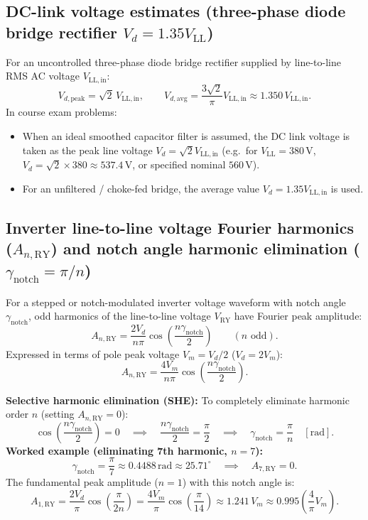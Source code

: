 \subsection{DC-link voltage estimates (three-phase diode bridge rectifier \texorpdfstring{$V_d = 1.35 V_{\mathrm{LL}}$}{V_d = 1.35 V_LL})}
For an uncontrolled three-phase diode bridge rectifier supplied by line-to-line RMS AC voltage \(V_{\mathrm{LL,in}}\):
\[
V_{d,\mathrm{peak}} = \sqrt{2}\,V_{\mathrm{LL,in}},
\qquad
V_{d,\mathrm{avg}} = \frac{3\sqrt{2}}{\pi}V_{\mathrm{LL,in}} \approx 1.350\,V_{\mathrm{LL,in}}.
\]
In course exam problems:
\begin{itemize}
  \item When an ideal smoothed capacitor filter is assumed, the DC link voltage is taken as the peak line voltage \(V_d = \sqrt{2} V_{\mathrm{LL,in}}\) (e.g.\ for \(V_{\mathrm{LL}}=380\,\mathrm{V}\), \(V_d = \sqrt{2}\times 380 \approx 537.4\,\mathrm{V}\), or specified nominal \(560\,\mathrm{V}\)).
  \item For an unfiltered / choke-fed bridge, the average value \(V_d = 1.35 V_{\mathrm{LL,in}}\) is used.
\end{itemize}

\subsection{Inverter line-to-line voltage Fourier harmonics (\texorpdfstring{$A_{n,\mathrm{RY}}$}{A_n,RY}) and notch angle harmonic elimination (\texorpdfstring{$\gamma_{\mathrm{notch}} = \pi/n$}{gamma_notch = pi/n})}
For a stepped or notch-modulated inverter voltage waveform with notch angle \(\gamma_{\mathrm{notch}}\), odd harmonics of the line-to-line voltage \(V_{\mathrm{RY}}\) have Fourier peak amplitude:
\[
A_{n,\mathrm{RY}} = \frac{2 V_d}{n\pi}\cos\left(\frac{n\gamma_{\mathrm{notch}}}{2}\right) \qquad (n\text{ odd}).
\]
Expressed in terms of pole peak voltage \(V_m = V_d/2\) (\(V_d = 2 V_m\)):
\[
A_{n,\mathrm{RY}} = \frac{4 V_m}{n\pi}\cos\left(\frac{n\gamma_{\mathrm{notch}}}{2}\right).
\]

\textbf{Selective harmonic elimination (SHE):}
To completely eliminate harmonic order \(n\) (setting \(A_{n,\mathrm{RY}} = 0\)):
\[
\cos\left(\frac{n\gamma_{\mathrm{notch}}}{2}\right) = 0
\quad\implies\quad
\frac{n\gamma_{\mathrm{notch}}}{2} = \frac{\pi}{2}
\quad\implies\quad
\gamma_{\mathrm{notch}} = \frac{\pi}{n} \quad [\mathrm{rad}].
\]
\textbf{Worked example (eliminating 7th harmonic, \(n=7\)):}
\[
\gamma_{\mathrm{notch}} = \frac{\pi}{7} \approx 0.4488\,\mathrm{rad} \approx 25.71^\circ
\quad\implies\quad
A_{7,\mathrm{RY}} = 0.
\]
The fundamental peak amplitude (\(n=1\)) with this notch angle is:
\[
A_{1,\mathrm{RY}} = \frac{2 V_d}{\pi}\cos\left(\frac{\pi}{2n}\right) = \frac{4 V_m}{\pi}\cos\left(\frac{\pi}{14}\right) \approx 1.241\,V_m \approx 0.995\left(\frac{4}{\pi}V_m\right).
\]

